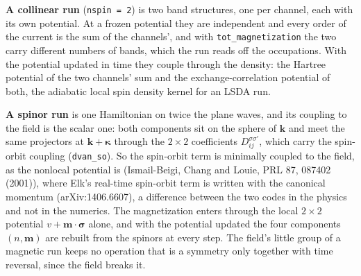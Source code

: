 \documentclass[11pt,a4paper]{article}
\newcommand{\code}[1]{\texttt{\small #1}}
\begin{document}
\textbf{A collinear run} (\code{nspin = 2}) is two band structures, one per
channel, each with its own potential. At a frozen potential they are independent
and every order of the current is the sum of the channels', and with
\code{tot\_magnetization} the two carry different numbers of bands, which the run
reads off the occupations. With the potential updated in time they couple through
the density: the Hartree potential of the two channels' sum and the
exchange-correlation potential of both, the adiabatic local spin density kernel
for an LSDA run.

\textbf{A spinor run} is one Hamiltonian on twice the plane waves, and its
coupling to the field is the scalar one: both components sit on the sphere of
$\mathbf k$ and meet the same projectors at $\mathbf k+\boldsymbol\kappa$ through
the $2\times2$ coefficients $D^{\sigma\sigma'}_{ij}$, which carry the spin-orbit
coupling (\code{dvan\_so}). So the spin-orbit term is minimally coupled to the
field, as the nonlocal potential is (Ismail-Beigi, Chang and Louie, PRL 87,
087402 (2001)), where Elk's real-time spin-orbit term is written with the
canonical momentum (arXiv:1406.6607), a difference between the two codes in the
physics and not in the numerics. The magnetization enters through the local
$2\times2$ potential $v + \mathbf m\cdot\boldsymbol\sigma$ alone, and with the
potential updated the four components $(n, \mathbf m)$ are rebuilt from the
spinors at every step. The field's little group of a magnetic run keeps no
operation that is a symmetry only together with time reversal, since the field
breaks it.
\end{document}
